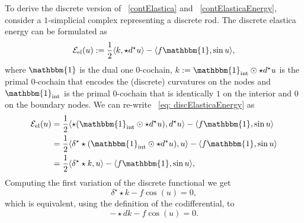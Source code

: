 \documentclass{article}
\theoremstyle{definition} %
\theoremstyle{plain} %
\theoremstyle{remark} %
\begin{document}
To derive the discrete version of ~\eqref{contElastica} and ~\eqref{contElasticaEnergy}, consider a $1$-simplicial complex representing a discrete rod. The discrete elastica energy can be formulated as
\begin{equation}
        \mathcal{E}_{\text{el}}(u) := \frac{1}{2} \langle k, \star d^\star u \rangle - \langle f\mathbbm{1}, \sin u  \rangle, \label{eq: discElasticaEnergy}
\end{equation}
where $\mathbbm{1}$ is the dual one $0$-cochain, $k := \mathbbm{1}_{\text{int}} \odot \star d^\star u$ is the primal $0$-cochain that encodes the (discrete) curvatures on the nodes and $\mathbbm{1}_{\text{int}}$ is the primal $0$-cochain that is identically $1$ on the interior and $0$ on the boundary nodes.
We can re-write ~\eqref{eq: discElasticaEnergy} as
\begin{align}
    \mathcal{E}_{\text{el}}(u) &= \frac{1}{2} \langle \star (\mathbbm{1}_{\text{int}} \odot \star d^\star u), d^\star u \rangle - \langle f\mathbbm{1}, \sin u  \rangle\\
    &= \frac{1}{2} \langle \delta^\star \star (\mathbbm{1}_{\text{int}} \odot \star d^\star u), u \rangle - \langle f\mathbbm{1}, \sin u  \rangle\\
    &= \frac{1}{2} \langle \delta^\star\star k, u \rangle - \langle f\mathbbm{1}, \sin u  \rangle,
\end{align}
Computing the first variation of the discrete functional we get
\begin{equation}
    \delta^\star \star k - f\cos(u) = 0,
\end{equation}
which is equivalent, using the definition of the codifferential, to
\begin{equation}
     -\star d k - f\cos(u) = 0. \label{discElastica}
\end{equation}
\end{document}
